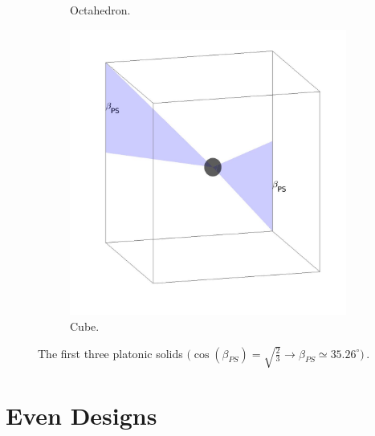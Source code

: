 \begin{figure}[!h]
\begin{subfigure}[b]{0.27\textwidth}
    \caption{Octahedron.} \label{fig:octahedron}
  \end{subfigure}
  \hspace*{\fill} %
  \begin{subfigure}[b]{0.26\textwidth}
    \includegraphics[width=\linewidth]{images/cube.jpg}
    \caption{Cube.} \label{fig:cube}
  \end{subfigure}
  \caption{The first three platonic solids $\big(\cos(\beta_{PS}) = \sqrt{\frac{2}{3}}
  \rightarrow \beta_{PS} \simeq 35.26^{\circ}\big)\, .$}
  \label{fig:platonic_solid}
\end{figure}

\section{Even Designs}
\label{sec:even_designs}
